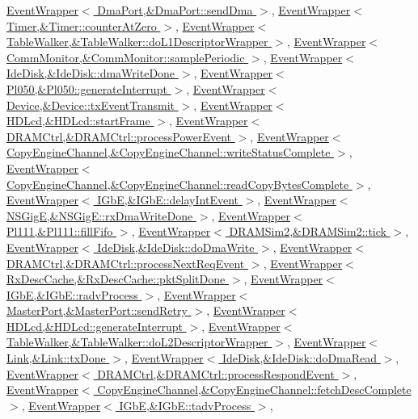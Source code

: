 \hyperlink{classEventWrapper_a6490f765a824ced1cc94979609fe7e07}{EventWrapper$<$ DmaPort,\&DmaPort::sendDma $>$}, \hyperlink{classEventWrapper_a6490f765a824ced1cc94979609fe7e07}{EventWrapper$<$ Timer,\&Timer::counterAtZero $>$}, \hyperlink{classEventWrapper_a6490f765a824ced1cc94979609fe7e07}{EventWrapper$<$ TableWalker,\&TableWalker::doL1DescriptorWrapper $>$}, \hyperlink{classEventWrapper_a6490f765a824ced1cc94979609fe7e07}{EventWrapper$<$ CommMonitor,\&CommMonitor::samplePeriodic $>$}, \hyperlink{classEventWrapper_a6490f765a824ced1cc94979609fe7e07}{EventWrapper$<$ IdeDisk,\&IdeDisk::dmaWriteDone $>$}, \hyperlink{classEventWrapper_a6490f765a824ced1cc94979609fe7e07}{EventWrapper$<$ Pl050,\&Pl050::generateInterrupt $>$}, \hyperlink{classEventWrapper_a6490f765a824ced1cc94979609fe7e07}{EventWrapper$<$ Device,\&Device::txEventTransmit $>$}, \hyperlink{classEventWrapper_a6490f765a824ced1cc94979609fe7e07}{EventWrapper$<$ HDLcd,\&HDLcd::startFrame $>$}, \hyperlink{classEventWrapper_a6490f765a824ced1cc94979609fe7e07}{EventWrapper$<$ DRAMCtrl,\&DRAMCtrl::processPowerEvent $>$}, \hyperlink{classEventWrapper_a6490f765a824ced1cc94979609fe7e07}{EventWrapper$<$ CopyEngineChannel,\&CopyEngineChannel::writeStatusComplete $>$}, \hyperlink{classEventWrapper_a6490f765a824ced1cc94979609fe7e07}{EventWrapper$<$ CopyEngineChannel,\&CopyEngineChannel::readCopyBytesComplete $>$}, \hyperlink{classEventWrapper_a6490f765a824ced1cc94979609fe7e07}{EventWrapper$<$ IGbE,\&IGbE::delayIntEvent $>$}, \hyperlink{classEventWrapper_a6490f765a824ced1cc94979609fe7e07}{EventWrapper$<$ NSGigE,\&NSGigE::rxDmaWriteDone $>$}, \hyperlink{classEventWrapper_a6490f765a824ced1cc94979609fe7e07}{EventWrapper$<$ Pl111,\&Pl111::fillFifo $>$}, \hyperlink{classEventWrapper_a6490f765a824ced1cc94979609fe7e07}{EventWrapper$<$ DRAMSim2,\&DRAMSim2::tick $>$}, \hyperlink{classEventWrapper_a6490f765a824ced1cc94979609fe7e07}{EventWrapper$<$ IdeDisk,\&IdeDisk::doDmaWrite $>$}, \hyperlink{classEventWrapper_a6490f765a824ced1cc94979609fe7e07}{EventWrapper$<$ DRAMCtrl,\&DRAMCtrl::processNextReqEvent $>$}, \hyperlink{classEventWrapper_a6490f765a824ced1cc94979609fe7e07}{EventWrapper$<$ RxDescCache,\&RxDescCache::pktSplitDone $>$}, \hyperlink{classEventWrapper_a6490f765a824ced1cc94979609fe7e07}{EventWrapper$<$ IGbE,\&IGbE::radvProcess $>$}, \hyperlink{classEventWrapper_a6490f765a824ced1cc94979609fe7e07}{EventWrapper$<$ MasterPort,\&MasterPort::sendRetry $>$}, \hyperlink{classEventWrapper_a6490f765a824ced1cc94979609fe7e07}{EventWrapper$<$ HDLcd,\&HDLcd::generateInterrupt $>$}, \hyperlink{classEventWrapper_a6490f765a824ced1cc94979609fe7e07}{EventWrapper$<$ TableWalker,\&TableWalker::doL2DescriptorWrapper $>$}, \hyperlink{classEventWrapper_a6490f765a824ced1cc94979609fe7e07}{EventWrapper$<$ Link,\&Link::txDone $>$}, \hyperlink{classEventWrapper_a6490f765a824ced1cc94979609fe7e07}{EventWrapper$<$ IdeDisk,\&IdeDisk::doDmaRead $>$}, \hyperlink{classEventWrapper_a6490f765a824ced1cc94979609fe7e07}{EventWrapper$<$ DRAMCtrl,\&DRAMCtrl::processRespondEvent $>$}, \hyperlink{classEventWrapper_a6490f765a824ced1cc94979609fe7e07}{EventWrapper$<$ CopyEngineChannel,\&CopyEngineChannel::fetchDescComplete $>$}, \hyperlink{classEventWrapper_a6490f765a824ced1cc94979609fe7e07}{EventWrapper$<$ IGbE,\&IGbE::tadvProcess $>$}, 